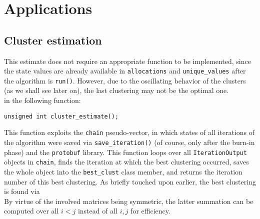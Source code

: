 \chapter{Applications}

\section{Cluster estimation}
This estimate does not require an appropriate function to be implemented, since the state values are already available in \verb|allocations| and \verb|unique_values| after the algorithm is \verb|run()|.
However, due to the oscillating behavior of the clusters (as we shall see later on), the last clustering may not be the optimal one. \\
in the following function:
\begin{verbatim}
unsigned int cluster_estimate();
\end{verbatim}
This function exploits the \verb|chain| pseudo-vector, in which states of all iterations of the algorithm were saved via \verb|save_iteration()| (of course, only after the burn-in phase) and the \verb|protobuf| library.
This function loops over all \verb|IterationOutput| objects in \verb|chain|, finds the iteration at which the best clustering occurred, saves the whole object into the \verb|best_clust| class member, and returns the iteration number of this best clustering.
As briefly touched upon earlier, the best clustering is found via \\
By virtue of the involved matrices being symmetric, the latter summation can be computed over all $i<j$ instead of all $i,j$ for efficiency. \\


